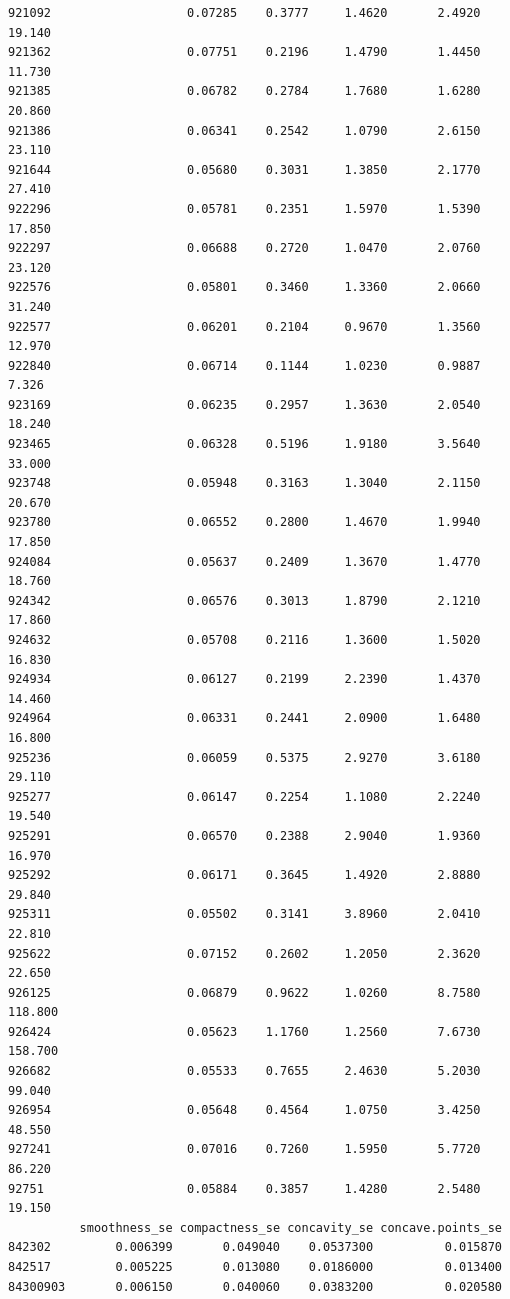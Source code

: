 \documentclass[
  letterpaper,
  DIV=11,
  numbers=noendperiod]{scrartcl}
\begin{document}
\begin{verbatim}
921092                   0.07285    0.3777     1.4620       2.4920  19.140
921362                   0.07751    0.2196     1.4790       1.4450  11.730
921385                   0.06782    0.2784     1.7680       1.6280  20.860
921386                   0.06341    0.2542     1.0790       2.6150  23.110
921644                   0.05680    0.3031     1.3850       2.1770  27.410
922296                   0.05781    0.2351     1.5970       1.5390  17.850
922297                   0.06688    0.2720     1.0470       2.0760  23.120
922576                   0.05801    0.3460     1.3360       2.0660  31.240
922577                   0.06201    0.2104     0.9670       1.3560  12.970
922840                   0.06714    0.1144     1.0230       0.9887   7.326
923169                   0.06235    0.2957     1.3630       2.0540  18.240
923465                   0.06328    0.5196     1.9180       3.5640  33.000
923748                   0.05948    0.3163     1.3040       2.1150  20.670
923780                   0.06552    0.2800     1.4670       1.9940  17.850
924084                   0.05637    0.2409     1.3670       1.4770  18.760
924342                   0.06576    0.3013     1.8790       2.1210  17.860
924632                   0.05708    0.2116     1.3600       1.5020  16.830
924934                   0.06127    0.2199     2.2390       1.4370  14.460
924964                   0.06331    0.2441     2.0900       1.6480  16.800
925236                   0.06059    0.5375     2.9270       3.6180  29.110
925277                   0.06147    0.2254     1.1080       2.2240  19.540
925291                   0.06570    0.2388     2.9040       1.9360  16.970
925292                   0.06171    0.3645     1.4920       2.8880  29.840
925311                   0.05502    0.3141     3.8960       2.0410  22.810
925622                   0.07152    0.2602     1.2050       2.3620  22.650
926125                   0.06879    0.9622     1.0260       8.7580 118.800
926424                   0.05623    1.1760     1.2560       7.6730 158.700
926682                   0.05533    0.7655     2.4630       5.2030  99.040
926954                   0.05648    0.4564     1.0750       3.4250  48.550
927241                   0.07016    0.7260     1.5950       5.7720  86.220
92751                    0.05884    0.3857     1.4280       2.5480  19.150
          smoothness_se compactness_se concavity_se concave.points_se
842302         0.006399       0.049040    0.0537300          0.015870
842517         0.005225       0.013080    0.0186000          0.013400
84300903       0.006150       0.040060    0.0383200          0.020580

\end{verbatim}
\end{document}
